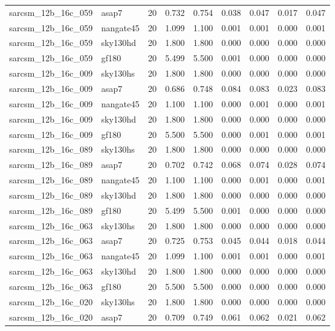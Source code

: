 \begin{tabular}{llrrrrrrr}
sarcsm\_12b\_16c\_059 & asap7 & 20 & 0.732 & 0.754 & 0.038 & 0.047 & 0.017 & 0.047 \\
sarcsm\_12b\_16c\_059 & nangate45 & 20 & 1.099 & 1.100 & 0.001 & 0.001 & 0.000 & 0.001 \\
sarcsm\_12b\_16c\_059 & sky130hd & 20 & 1.800 & 1.800 & 0.000 & 0.000 & 0.000 & 0.000 \\
sarcsm\_12b\_16c\_059 & gf180 & 20 & 5.499 & 5.500 & 0.001 & 0.000 & 0.000 & 0.000 \\
sarcsm\_12b\_16c\_009 & sky130hs & 20 & 1.800 & 1.800 & 0.000 & 0.000 & 0.000 & 0.000 \\
sarcsm\_12b\_16c\_009 & asap7 & 20 & 0.686 & 0.748 & 0.084 & 0.083 & 0.023 & 0.083 \\
sarcsm\_12b\_16c\_009 & nangate45 & 20 & 1.100 & 1.100 & 0.000 & 0.001 & 0.000 & 0.001 \\
sarcsm\_12b\_16c\_009 & sky130hd & 20 & 1.800 & 1.800 & 0.000 & 0.000 & 0.000 & 0.000 \\
sarcsm\_12b\_16c\_009 & gf180 & 20 & 5.500 & 5.500 & 0.000 & 0.001 & 0.000 & 0.001 \\
sarcsm\_12b\_16c\_089 & sky130hs & 20 & 1.800 & 1.800 & 0.000 & 0.000 & 0.000 & 0.000 \\
sarcsm\_12b\_16c\_089 & asap7 & 20 & 0.702 & 0.742 & 0.068 & 0.074 & 0.028 & 0.074 \\
sarcsm\_12b\_16c\_089 & nangate45 & 20 & 1.100 & 1.100 & 0.000 & 0.001 & 0.000 & 0.001 \\
sarcsm\_12b\_16c\_089 & sky130hd & 20 & 1.800 & 1.800 & 0.000 & 0.000 & 0.000 & 0.000 \\
sarcsm\_12b\_16c\_089 & gf180 & 20 & 5.499 & 5.500 & 0.001 & 0.000 & 0.000 & 0.000 \\
sarcsm\_12b\_16c\_063 & sky130hs & 20 & 1.800 & 1.800 & 0.000 & 0.000 & 0.000 & 0.000 \\
sarcsm\_12b\_16c\_063 & asap7 & 20 & 0.725 & 0.753 & 0.045 & 0.044 & 0.018 & 0.044 \\
sarcsm\_12b\_16c\_063 & nangate45 & 20 & 1.099 & 1.100 & 0.001 & 0.001 & 0.000 & 0.001 \\
sarcsm\_12b\_16c\_063 & sky130hd & 20 & 1.800 & 1.800 & 0.000 & 0.000 & 0.000 & 0.000 \\
sarcsm\_12b\_16c\_063 & gf180 & 20 & 5.500 & 5.500 & 0.000 & 0.000 & 0.000 & 0.000 \\
sarcsm\_12b\_16c\_020 & sky130hs & 20 & 1.800 & 1.800 & 0.000 & 0.000 & 0.000 & 0.000 \\
sarcsm\_12b\_16c\_020 & asap7 & 20 & 0.709 & 0.749 & 0.061 & 0.062 & 0.021 & 0.062 \\

\end{tabular}
